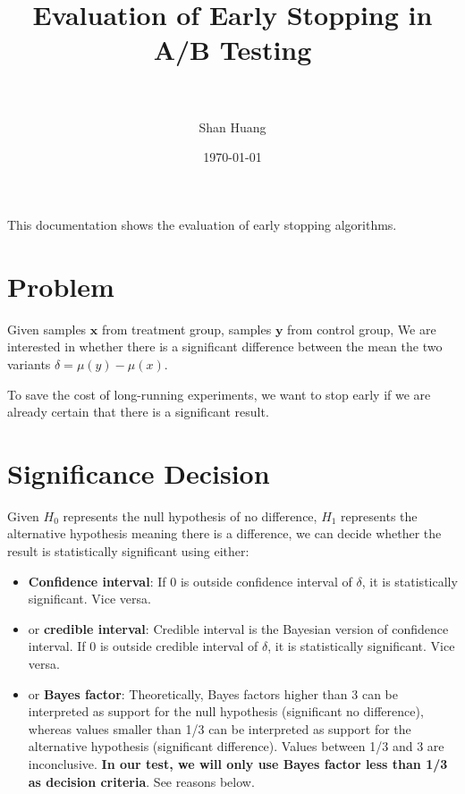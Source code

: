 \documentclass[paper=a4, fontsize=11pt]{scrartcl} %
\title{	
\normalfont \normalsize 
\textsc{} \\ [25pt] %
\horrule{0.5pt} \\[0.4cm] %
\huge Evaluation of Early Stopping in A/B Testing  \\ %
\horrule{2pt} \\[0.5cm] %
}
\author{Shan Huang} %
\date{\normalsize\today} %
\numberwithin{equation}{section} %
\numberwithin{figure}{section} %
\numberwithin{table}{section} %
\begin{document}
\maketitle %


This documentation shows the evaluation of early stopping algorithms. 

\section{Problem}
Given samples $\textbf{x}$ from treatment group, samples $\textbf{y}$ from control group, We are interested in whether there is a significant difference  between the mean the two variants $\delta = \mu(y)-\mu(x)$.

To save the cost of long-running experiments, we want to stop early if we are already certain that there is a significant result.

\section{Significance Decision}
\label{sec:byt}
Given $H_0$ represents the null hypothesis of no difference, $H_1$ represents the alternative hypothesis meaning there is a difference, we can decide whether the result is statistically significant using either:

\begin{itemize}  
\item \textbf{Confidence interval}: If 0 is outside confidence interval of $\delta$, it is statistically significant. Vice versa.
\item or \textbf{credible interval}: Credible interval is the Bayesian version of confidence interval. If 0 is outside credible interval of $\delta$, it is statistically significant. Vice versa.
\item or \textbf{Bayes factor}: Theoretically, Bayes factors higher than 3 can be interpreted as support for the null hypothesis (significant no difference), whereas values smaller than 1/3 can be interpreted as support for the alternative hypothesis (significant difference). Values between 1/3 and 3 are inconclusive. \textbf{In our test, we will only use Bayes factor less than 1/3 as decision criteria}. See reasons below.
\end{itemize}
\end{document}
